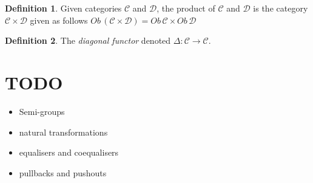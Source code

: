 \documentclass{article}
\theoremstyle{definition}
\newtheorem{definition}{Definition}[section]
\newcommand{\C}{\mathcal{C}}
\newcommand{\D}{\mathcal{D}}
\begin{document}
\begin{definition}
	Given categories $\C$ and $\D$,
	the product of $\C$ and $\D$ is the category $\C \times \D$
	given as follows $Ob\,(\C \times \D) = Ob\,\C \times Ob\,\D$
\end{definition}

\begin{definition}
	The \textit{diagonal functor} denoted $\Delta : \C \rightarrow \C$.
\end{definition}


\section{TODO}
\begin{itemize}
\item Semi-groups
\item natural transformations
\item equalisers and coequalisers
\item pullbacks and pushouts
\end{itemize}
\end{document}
